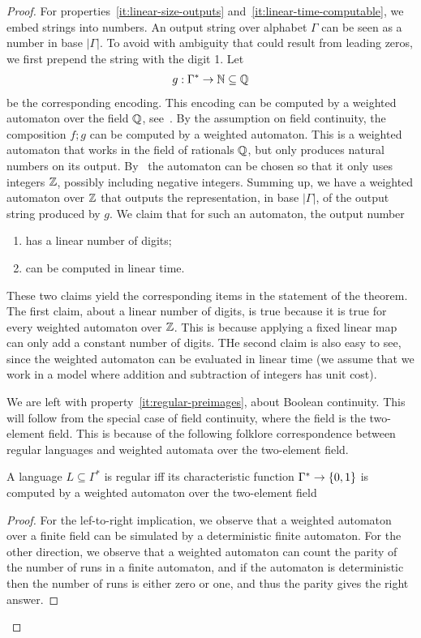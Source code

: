 \begin{proof}
    For properties~\ref{it:linear-size-outputs} and~\ref{it:linear-time-computable}, we embed strings into numbers. 
    An output string over alphabet $\Gamma$ can be seen as a number in base $|\Gamma|$. To avoid with ambiguity that could result from leading zeros, we first prepend the string with the digit 1. Let 
    \begin{align*}
    g : \Gamma^* \to {\mathbb N} \subseteq {\mathbb Q}
    \end{align*} 
    be the corresponding encoding. This encoding can be computed by a weighted automaton over the field ${\mathbb Q}$, see~\cite[Lemma 8.10]{bojanczyk_automata_2025}. By  the assumption on field continuity, the composition $f;g$ can be computed by a weighted automaton. This is a weighted automaton that works in the field of rationals ${\mathbb Q}$, but  only produces natural numbers on its output. By~\cite[p. 110]{BerstelReutenauer08}  the automaton can be chosen so that it only uses  integers ${\mathbb Z}$, possibly including negative integers. Summing up, we have a weighted automaton over ${\mathbb Z}$ that outputs the representation, in base $|\Gamma|$, of the output string produced by $g$. We claim that for such an automaton, the output number
    \begin{enumerate}
        \item has a linear number of digits;
        \item can be computed in linear time.
    \end{enumerate}
    These two claims yield the corresponding items in the statement of the theorem. The first claim, about a linear number of digits, is true because it is true for every weighted automaton over ${\mathbb Z}$. This is because applying a fixed linear map can only add a constant number of digits. THe second claim is also easy to see, since the weighted automaton can be evaluated in linear time (we assume that we work in a model where addition and subtraction of integers has unit cost). 

    We are left with property~\ref{it:regular-preimages}, about Boolean continuity.  This will follow from the special case of field continuity, where the field is  the two-element field.  This is because of  the following  folklore correspondence between regular languages and weighted automata over the two-element field. 
        
        \begin{claim}\label{claim:regular-weighted-automata}
            A language $L \subseteq \Gamma^*$ is regular iff its characteristic function $\Gamma^* \to \{0,1\}$ is computed by a weighted automaton over the two-element field 
        \end{claim}
        \begin{proof}
            For the lef-to-right implication, we observe that a weighted automaton over a finite field can be simulated by a deterministic finite automaton. For the other direction, we observe that a weighted automaton can count the parity of  the number of runs in a finite automaton, and if the automaton is deterministic then the number of runs is either zero or one, and thus the parity gives the right answer.
        \end{proof}


\end{proof}
